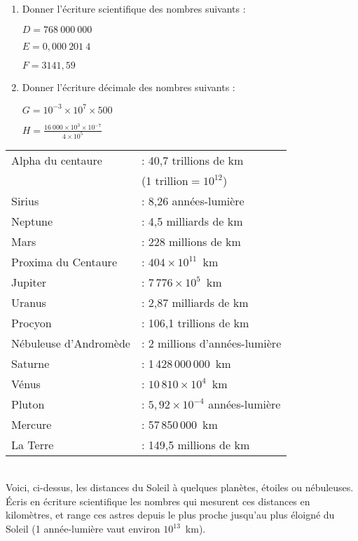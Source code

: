 \documentclass[10pt]{article}
\begin{document}
{\begin{Exo}
\begin{enumerate}
\item Donner l'écriture scientifique des nombres suivants :

\bigskip

\begin{multicols}{3}

$D=768~000~000$

\columnbreak

$E=0,000~201~4$

\columnbreak

$F=3141,59$

\end{multicols}

\item Donner l'écriture décimale des nombres suivants :

\begin{multicols}{2}

$G=10^{-3} \times 10^{7}\times 500$


\columnbreak

$H=\frac{16~000 \times 10^3 \times 10^{-7}}{4 \times 10^5}$ 

\end{multicols}
\end{enumerate}

\end{Exo}

\begin{Exo}
\par
  \begin{tabular}{ll}
    Alpha du centaure&: 40,7 trillions de km\\
&(1 trillion$=10^{12}$)\\
Sirius&: 8,26 années-lumière\\
Neptune&: 4,5 milliards de km\\
Mars&: 228 millions de km\\
Proxima du Centaure&: $404\times10^11$~km\\
Jupiter&: $7\,776\times10^5$~km\\
Uranus&: 2,87 milliards de km\\
Procyon&: 106,1 trillions de km\\
Nébuleuse d'Andromède&: 2 millions d'années-lumière\\
Saturne&: 1\,428\,000\,000~km\\
Vénus&: $10\,810\times10^4$~km\\
Pluton&: $5,92\times10^{-4}$ années-lumière\\
Mercure&: 57\,850\,000~km\\
La Terre&: 149,5 millions de km\\
  \end{tabular}\\
Voici, ci-dessus, les distances du Soleil à quelques planètes, étoiles ou nébuleuses. \'Ecris en écriture scientifique les nombres qui mesurent ces distances en kilomètres, et range ces astres depuis le plus proche jusqu'au plus éloigné du Soleil (1 année-lumière vaut environ $10^{13}$~km).
\end{Exo}


}
\end{document}
